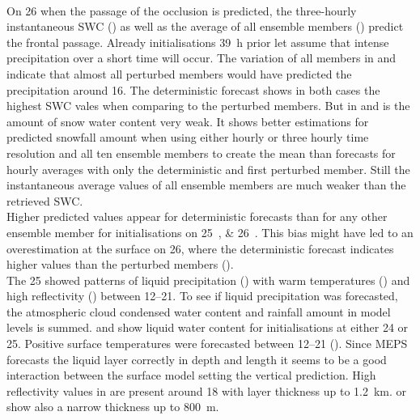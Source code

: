 \\ 
On \SI{26}{\dec} when the passage of the occlusion is predicted, the three-hourly instantaneous SWC () as well as the average of all ensemble members () predict the frontal passage. 
Already initialisations \SI{39}{\hour} prior let assume that intense precipitation over a short time will occur. The variation of all members in  and  indicate that almost all perturbed members would have predicted the precipitation around \SI{16}{\UTC}. The deterministic forecast shows in both cases the highest SWC vales when comparing to the perturbed members. But in  and  is the amount of snow water content very weak. It shows better estimations for predicted snowfall amount when using either hourly or three hourly time resolution and all ten ensemble members to create the mean than forecasts for hourly averages with only the deterministic and first perturbed member.
Still the instantaneous average values of all ensemble members are much weaker than the retrieved SWC.
\\
Higher predicted values appear for deterministic forecasts than for any other ensemble member for initialisations on \SIlist{25;26}{\dec}. This bias might have led to an overestimation at the surface on \SI{26}{\dec}, where the deterministic forecast indicates higher values than the perturbed members (). 
\\
The \SI{25}{\dec} showed patterns of liquid precipitation () with warm temperatures () and high reflectivity () between \SIrange{12}{21}{\UTC}. To see if liquid precipitation was forecasted, the atmospheric cloud condensed water content and rainfall amount in model levels is summed.  and  show liquid water content for initialisations at either \SI{24}{\dec} or \SI{25}{\dec}. 
Positive surface temperatures were forecasted between \SIrange{12}{21}{\UTC} (). Since MEPS forecasts the liquid layer correctly in depth and length it seems to be a good interaction between the surface model setting the vertical prediction. 
High reflectivity values in  are present around \SI{18}{\UTC} with layer thickness up to \SI{1.2}{\km}.  or  show also a narrow thickness up to \SI{800}{\metre}. 
\\
